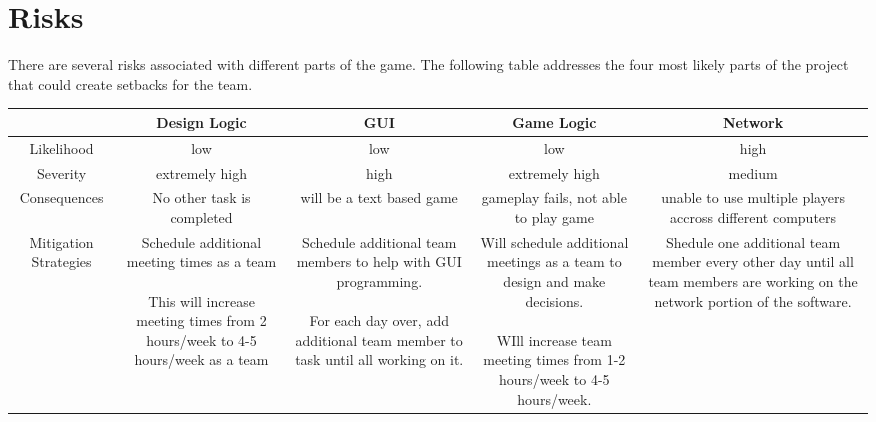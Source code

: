 \documentclass[11pt, titlepage]{article}
\begin{document}
    \section{Risks}

	    There are several risks associated with different parts of the game.  The following table addresses the four most likely parts of the project that could create setbacks for the team.

				\begin{tabular}{| c | c | c | c | c |}
					\hline	 
						&\parbox{3cm}{Design Logic} 
						& \parbox{3cm}{GUI} 
						& \parbox{3cm}{Game Logic} 
						& \parbox{3cm}{Network} \\
					\hline	Likelihood 
						& low 
						& low 
						& low 
						& high \\
					\hline Severity 
						&extremely high 
						& high 
						& extremely high
						&  medium\\
					\hline Consequences 
						& \parbox{3cm}{No other task is completed} 
						& \parbox{3cm}{will be a text based game}
						& \parbox{3cm}{gameplay fails, not able to play game}
						& \parbox{3cm}{unable to use multiple players accross different computers} \\
					\hline Mitigation Strategies 
						& \parbox{3cm}{
									Schedule additional meeting times as a team
									\\ \\This will increase meeting times from 2 hours/week to 4-5 hours/week as a team
							}
						&  \parbox{3cm}{
									Schedule additional team members to help with GUI programming.
									\\ \\For each day over, add additional team member to task until all working on it.
							}
						& \parbox{3cm}{
								Will schedule additional meetings as a team to design and make decisions.
								\\ \\WIll increase team meeting times from 1-2 hours/week to 4-5 hours/week.
								} 
						&\parbox{3cm}{Shedule one additional team member every other day until all team members are working on the network portion of the software.  }\\
					\hline
				\end{tabular}
\end{document}
